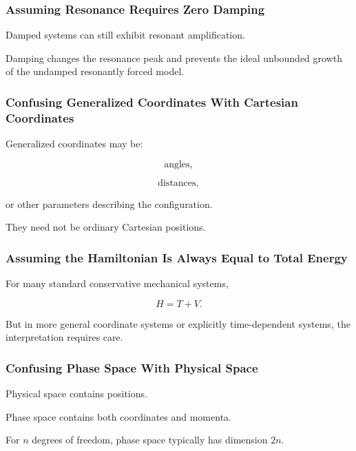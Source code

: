 \subsubsection{Assuming Resonance Requires Zero Damping}

Damped systems can still exhibit resonant amplification.

Damping changes the resonance peak and prevents the ideal unbounded growth
of the undamped resonantly forced model.

\subsubsection{Confusing Generalized Coordinates With Cartesian Coordinates}

Generalized coordinates may be:

\[
\boxed{
\text{angles},
}
\]

\[
\boxed{
\text{distances},
}
\]

or other parameters describing the configuration.

They need not be ordinary Cartesian positions.

\subsubsection{Assuming the Hamiltonian Is Always Equal to Total Energy}

For many standard conservative mechanical systems,

\[
H=T+V.
\]

But in more general coordinate systems or explicitly time-dependent systems,
the interpretation requires care.

\subsubsection{Confusing Phase Space With Physical Space}

Physical space contains positions.

Phase space contains both coordinates and momenta.

For \(n\) degrees of freedom, phase space typically has dimension \(2n\).

